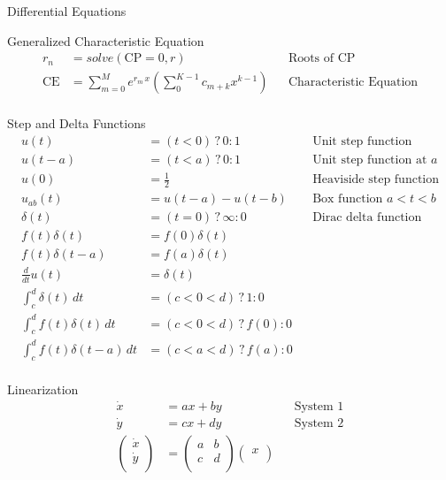 \begin{section}{Differential Equations}
\begin{subsection}{Generalized Characteristic Equation}
\begin{align*}
    r_{n} &= solve(\text{CP} = 0, r) && \text{Roots of CP}\\
    \text{CE} &=
       \sum_{m=0}^{M} e^{r_{m}\,x} \left( \sum_{0}^{K-1} c_{m+k} x^{k-1} \right) &&
       \text{Characteristic Equation}\\
  \end{align*}
  \end{subsection}
  \begin{subsection}{Step and Delta Functions}
    \begin{align*}
      u(t) &= (t<0) \,?\, 0 : 1 && \text{Unit step function}\\
      u(t-a) &= (t<a) \,?\, 0 : 1 && \text{Unit step function at $a$}\\
      u(0) &= \frac{1}{2} && \text{Heaviside step function}\\
      u_{ab}(t) &= u(t-a) - u(t-b) && \text{Box function $a<t<b$}\\
      \delta(t) &= (t=0)\,?\,\infty : 0 && \text{Dirac delta function}\\
      f(t)\delta(t) &= f(0)\delta(t) \\
      f(t)\delta(t-a) &= f(a)\delta(t) \\
      \frac{d}{dt}u(t) &= \delta(t)\\
      \int_c^d \delta(t)\,dt &= (c<0<d)\,?\,1:0 \\
      \int_c^d f(t)\delta(t)\,dt &= (c<0<d)\,?\,f(0):0 \\
      \int_c^d f(t)\delta(t-a)\,dt &= (c<a<d)\,?\,f(a):0 \\
    \end{align*}
  \end{subsection}
  \begin{subsection}{Linearization}
    \begin{align*}
      \dot{x} &= ax + by && \text{System 1}\\
      \dot{y} &= cx + dy && \text{System 2}\\
      \begin{pmatrix}
        \dot{x} \\
        \dot{y} \\
      \end{pmatrix}
      &=
      \begin{pmatrix}
        a & b \\
        c & d \\
      \end{pmatrix}
      \begin{pmatrix}
        x \\

\end{pmatrix}
\end{align*}
\end{subsection}
\end{section}
